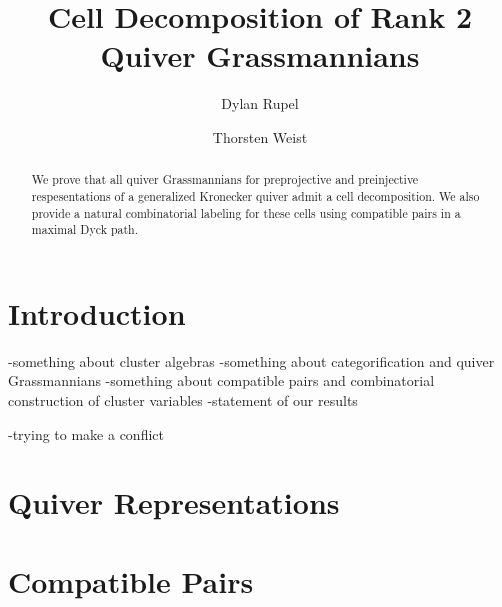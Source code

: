 \documentclass{amsart}
\author{Dylan Rupel}
\author{Thorsten Weist}
\title{Cell Decomposition of Rank 2 Quiver Grassmannians}
\begin{document}
\begin{abstract}
  We prove that all quiver Grassmannians for preprojective and preinjective respesentations of a generalized Kronecker quiver admit a cell decomposition.  
  We also provide a natural combinatorial labeling for these cells using compatible pairs in a maximal Dyck path. 
\end{abstract}
\maketitle

\section{Introduction}
-something about cluster algebras
-something about categorification and quiver Grassmannians
-something about compatible pairs and combinatorial construction of cluster variables
-statement of our results

-trying to make a conflict
\section{Quiver Representations}

\section{Compatible Pairs}
\end{document}
